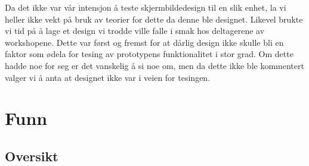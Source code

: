 \noindent
Da det ikke var vår intensjon å teste skjermbildedesign til en slik enhet, la vi heller ikke vekt på bruk av teorier for dette da denne ble designet. Likevel brukte vi tid på å lage et design vi trodde ville falle i smak hos deltagerene av workshopene. Dette var først og fremst for at dårlig design ikke skulle bli en faktor som ødela for tesing av prototypens funktionalitet i stor grad. Om dette hadde noe for seg er det vanskelig å si noe om, men da dette ikke ble kommentert valger vi å anta at designet ikke var i veien for tesingen.

\section{Funn}

\subsection{Oversikt}
\label{oversikt}
